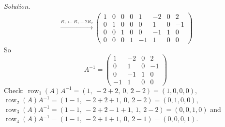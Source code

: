 \documentclass[12pt]{article}
\DeclareMathOperator{\row}{row}
\theoremstyle{definition}
\newenvironment{solution}{\par\noindent\textit{Solution.}\ }{\par\smallskip}
\begin{document}
\begin{solution}
\[\begin{gathered}
\xrightarrow{R_1\leftarrow R_1-2R_2}
\left(\begin{array}{cccc|cccc}1&0&0&0&1&-2&0&2\\0&1&0&0&0&1&0&-1\\0&0&1&0&0&-1&1&0\\0&0&0&1&-1&1&0&0\end{array}\right)
\end{gathered}
\]
So
\[
A^{-1}=\begin{pmatrix}1&-2&0&2\\0&1&0&-1\\0&-1&1&0\\-1&1&0&0\end{pmatrix}
\]
Check: \(\row_1(A)A^{-1}=(1,\ -2+2,\ 0,\ 2-2)=(1,0,0,0)\),
\(\row_2(A)A^{-1}=(1-1,\ -2+2+1,\ 0,\ 2-2)=(0,1,0,0)\),
\(\row_3(A)A^{-1}=(1-1,\ -2+2-1+1,\ 1,\ 2-2)=(0,0,1,0)\) and
\(\row_4(A)A^{-1}=(1-1,\ -2+1+1,\ 0,\ 2-1)=(0,0,0,1)\).
\end{solution}
\end{document}
